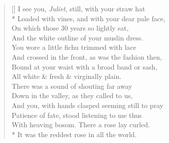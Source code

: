 \documentclass[MAIN]{subfiles}
\begin{document}
\settowidth{\versewidth}{\vin And crossed in the front, as was the fashion then,}
\begin{verse}[\versewidth]
I see you, \emph{Juliet}, still, with your straw hat\\*
\vin Loaded with vines, and with your dear pale face,\\
On which those 30 years so lightly sat,\\
\vin And the white outline of your muslin dress.\\
You wore a little {\hge fichu} trimmed with lace\\
\vin And crossed in the front, as was the fashion then,\\
Bound at your waist with a broad band or sash,\\
\vin All white \& fresh \& virginally plain.\\
There was a sound of shouting far away\\
\vin Down in the valley, as they called to us,\\
And you, with hands clasped seeming still to pray\\
\vin Patience of fate, stood listening to me thus\\
With heaving bosom. There a rose lay curled.\\*
It was the reddest rose in all the world.
\end{verse}
\end{document}
